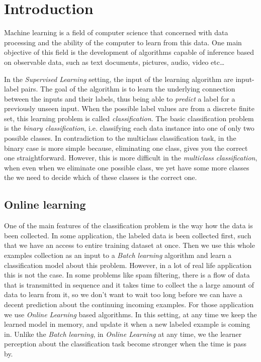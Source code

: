 \chapter{Introduction}


Machine learning is a  field of computer science that concerned with data processing and the ability
of the computer to learn from this data. 
One main objective of this field is the development of algorithms capable of inference based on 
observable data, such as text documents, pictures, audio, video etc\ldots 
 
In the \textit{Supervised Learning} setting, the input of the learning algorithm are input-label pairs. 
The goal of the algorithm is to learn the underlying connection between the inputs and their labels, 
thus being able to \textit{predict} a label for a previously unseen input. 
When the possible label values are from a discrete finite set, this learning problem is called
 \textit{classification}. The basic classification problem is the \textit{binary classification}, i.e. classifying 
 each data instance into one of only two possible classes. In contradiction to the multiclass classification
  task, in the binary 
 case is more simple because, eliminating one class, gives you the correct one 
 straightforward. However, this is more difficult in the \textit{multiclass 
 classification}, when even when we eliminate one possible class, we yet have 
 some more classes the we need to decide which of these classes  is the correct one. 
 

\section{Online learning}
\label{sec:online_learning}

One of the main features of the classification problem is the way how the data is been collected. 
In some application, the labeled data is been collected first, such that we have an access to entire training
 dataset at once. Then we use this whole examples collection as an input to 
 a \textit{Batch learning} algorithm and learn a classification model about this problem. 
However, in a lot of real life application this is not the case. In some problems like spam filtering, there is
a flow of data that is transmitted in sequence and it takes time to collect the a large amount of data to learn
 from it, so we don't want to wait too long before we can have a decent prediction about the continuing
  incoming examples. For those application we use  \textit{Online Learning} based algorithms. 
  In this setting, at any time we keep the learned model in memory, and update it when 
  a new labeled example is coming in.
Unlike the \textit{Batch learning}, in \textit{Online Learning} at any time, we 
the learner perception about the classification task become stronger when the time is pass by.
 
